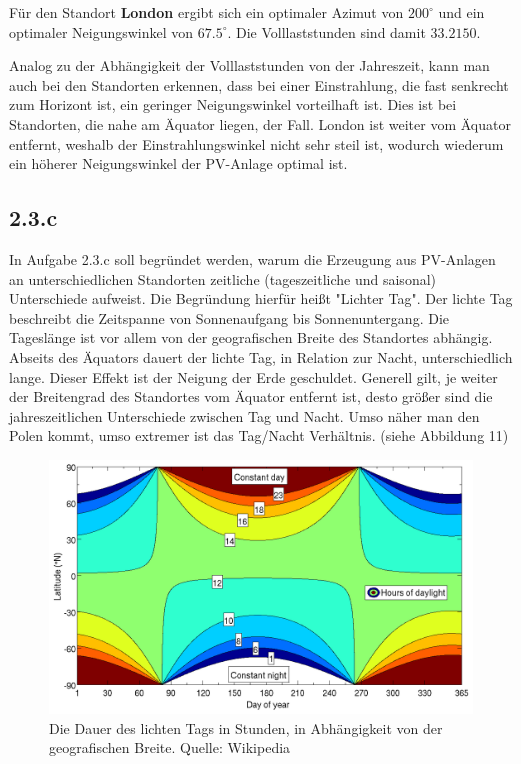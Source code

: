 \documentclass[a4paper,12pt]{article}
\begin{document}
	Für den Standort \textbf{London} ergibt sich ein optimaler Azimut von $200^{\circ}$ und ein optimaler Neigungswinkel von $67.5^{\circ}$. Die Volllaststunden sind damit $33.2150$.\\ \par
	Analog zu der Abhängigkeit der Volllaststunden von der Jahreszeit, kann man auch bei den Standorten erkennen, dass bei einer Einstrahlung, die fast senkrecht zum Horizont ist, ein geringer Neigungswinkel vorteilhaft ist. Dies ist bei Standorten, die nahe am Äquator liegen, der Fall.\newline
	London ist weiter vom Äquator entfernt, weshalb der Einstrahlungswinkel nicht sehr steil ist, wodurch wiederum ein höherer Neigungswinkel der PV-Anlage optimal ist.
	\subsection{2.3.c}
	In Aufgabe 2.3.c soll begründet werden, warum die Erzeugung aus PV-Anlagen an unterschiedlichen Standorten zeitliche (tageszeitliche und saisonal) Unterschiede aufweist.\newline
	Die Begründung hierfür heißt "Lichter Tag". Der lichte Tag beschreibt die Zeitspanne von Sonnenaufgang bis Sonnenuntergang.\newline
	Die Tageslänge ist vor allem von der geografischen Breite des Standortes abhängig. Abseits des Äquators dauert der lichte Tag, in Relation zur Nacht, unterschiedlich lange. Dieser Effekt ist der Neigung der Erde geschuldet.\newline
	Generell gilt, je weiter der Breitengrad des Standortes vom Äquator entfernt ist, desto größer sind die jahreszeitlichen Unterschiede zwischen Tag und Nacht.\newline
	Umso näher man den Polen kommt, umso extremer ist das Tag/Nacht Verhältnis. (siehe Abbildung 11)\newline
	\begin{figure}[H]
		\centering
		\includegraphics[width=12cm]{img/results/LichtTagDauer}
		\caption{Die Dauer des lichten Tags in Stunden, in Abhängigkeit von der geografischen Breite. Quelle: Wikipedia}
	\end{figure}
\end{document}
